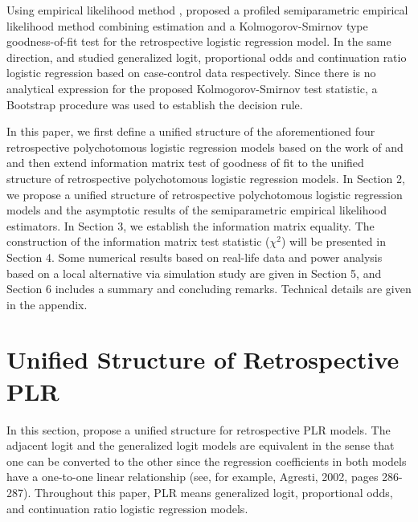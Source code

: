 \documentclass[12]{interact}
\theoremstyle{plain}%
\theoremstyle{definition}
\theoremstyle{remark}
\begin{document}
Using empirical likelihood method \citep{Owen-Biometrika-1988, Owen-Ann-1990}, \cite{Qin-Zhang-Biometrika-1997} proposed a profiled semiparametric empirical likelihood method combining estimation and a Kolmogorov-Smirnov type goodness-of-fit test for the retrospective logistic regression model. In the same direction, \cite{ZhangBiao-JMA-2002, ZhangBiao-AustrNZJS-2004} and \cite{Peng-Zhang-JSPI-2008} studied generalized logit, proportional odds and continuation ratio logistic regression based on case-control data respectively. Since there is no analytical expression for the proposed Kolmogorov-Smirnov test statistic, a Bootstrap procedure was used to establish the decision rule.

In this paper, we first define a unified structure of the aforementioned four retrospective polychotomous logistic regression models based on the work of \cite{ZhangBiao-JMA-2002, ZhangBiao-AustrNZJS-2004} and \cite{Peng-Zhang-JSPI-2008} and then extend \cite{ZhangBiao-Biometrika-2001} information matrix test of goodness of fit to the unified structure of retrospective polychotomous logistic regression models. In Section 2, we propose a unified structure of retrospective polychotomous logistic regression models and the asymptotic results of the semiparametric empirical likelihood estimators. In Section 3, we establish the information matrix equality. The construction of the information matrix test statistic ($\chi^2$) will be presented in Section 4. Some numerical results based on real-life data and power analysis based on a local alternative via simulation study are given in Section 5, and Section 6 includes a summary and concluding remarks. Technical details are given in the appendix.

\section{Unified Structure of Retrospective PLR}\label{sec2}


In this section, propose a unified structure for retrospective PLR models. The adjacent logit and the generalized logit models are equivalent in the sense that one can be converted to the other since the regression coefficients in both models have a one-to-one linear relationship (see, for example, Agresti, 2002, pages 286-287). Throughout this paper, PLR means generalized logit, proportional odds, and continuation ratio logistic regression models.
\end{document}
